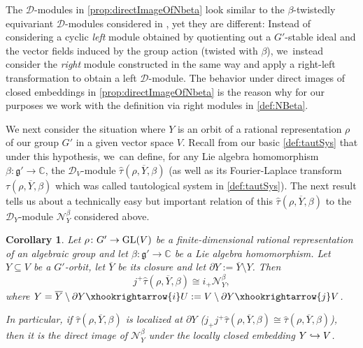 \documentclass[JEP,XML,SOM,Unicode,published]{cedram}
\let\mathds\mathbb
\newcommand\hto{\mathrel{\lhook\joinrel\to}}
\newtheorem{cor}[thm]{Corollary}
\newcommand{\dC}{{\mathds C}}\let\C\dC
\newcommand{\frg}{\mathfrak{g}}
\DeclareMathOperator{\GL}{\textup{GL}}
\begin{document}
The $\mathscr{D}$\nobreakdash-mod\-ules in \cref{prop:directImageOfNbeta} look similar to the $\beta$-twistedly equivariant $\mathscr{D}$\nobreakdash-mod\-ules considered in \cite[II.2]{Hot98}, yet they are different: Instead of considering a cyclic \emph{left} module obtained by quotienting out a $G'$-stable ideal and the vector fields induced by the group action (twisted with $\beta$), we~instead consider the \emph{right} module constructed in the same way and apply a right-left transformation to obtain a left $\mathscr{D}$\nobreakdash-mod\-ule. The behavior under direct images of closed embeddings in \cref{prop:directImageOfNbeta} is the reason why for our purposes we work with the definition via right modules in \cref{def:NBeta}.

We next consider the situation where $Y$ is an orbit
of a rational representation $\rho$ of our group $G'$ in a given vector space $V$. Recall from our basic \cref{def:tautSys} that under this hypothesis, we~can define, for any Lie algebra homomorphism $\beta\colon \frg'\to \dC$, the $\mathscr{D}_V$\nobreakdash-mod\-ule $\hat{\tau}(\rho, \overline{Y},\beta)$ (as well as its Fourier-Laplace transform $\tau(\rho, \overline{Y},\beta)$ which was called tautological system in \cref{def:tautSys}). The next result tells us about a technically easy but important relation of this $\hat{\tau}(\rho, \overline{Y},\beta)$ to the $\mathscr{D}_Y$\nobreakdash-mod\-ule $\mathscr{N}_Y^\beta$ considered above.

\begin{cor} \label{cor:FLTautSysAsDirectImage}
Let $\rho \colon G' \to \GL(V)$ be a finite-dimensional rational representation of an algebraic group and let $\beta \colon \frg' \to \C$ be a Lie algebra homomorphism. Let $Y \subseteq V$ be a $G'$-orbit, let $\overline{Y}$ be its closure and let $\partial Y := \overline Y \setminus Y$.
Then
\[
j^+ \hat{\tau}(\rho, \overline{Y}, \beta) \cong i_+ \mathscr{N}_{Y}^{\beta},
\]
where $Y = \overline Y \setminus \partial Y \xhookrightarrow{i} U:=V \setminus \partial Y \xhookrightarrow{j} V$.

In particular, if $\hat{\tau}(\rho, \overline{Y}, \beta)$ is localized at $\partial Y$ (\ie $j_+ j^+ \hat{\tau}(\rho,\overline{Y},\beta) \cong \hat{\tau}(\rho,\overline{Y},\beta)$), then it is the direct image of $\mathscr{N}_{Y}^{\beta}$ under the locally closed embedding $Y \hto V$.
\end{cor}
\end{document}
